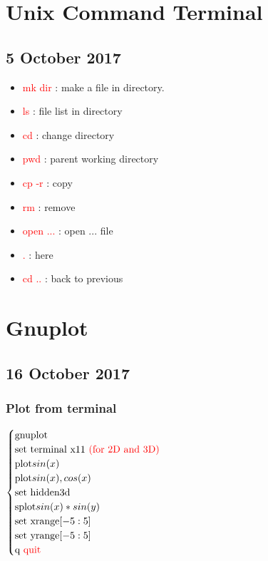 \documentclass[a4paper,10pt]{article}
\begin{document}
\newpage
\section{Unix Command Terminal}

\subsection{5 October 2017}
\begin{itemize}
	\item \textcolor{red}{mk dir} : make a file in directory.
	\item \textcolor{red}{ls} : file list in directory
	\item \textcolor{red}{cd} : change directory
	\item \textcolor{red}{pwd} : parent working directory
	\item \textcolor{red}{cp -r} : copy
	\item \textcolor{red}{rm} : remove
	\item \textcolor{red}{open ...} : open ... file
	\item \textcolor{red}{.} : here
	\item \textcolor{red}{cd ..} : back to previous
\end{itemize}

\section{Gnuplot}
\subsection{16 October 2017}
\subsubsection{Plot from terminal}
$ \begin{cases}
	\text{gnuplot} \\
	\text{set terminal x11 \textcolor{red}{(for 2D and 3D)}} \\
	\text{plot} sin(x) \\
	\text{plot} sin(x), cos(x) \\
	\text{set hidden3d} \\
	\text{splot} sin(x)*sin(y) \\
	\text{set xrange}[-5:5] \\
	\text{set yrange}[-5:5] \\
	\text{q \textcolor{red}{quit}}	
\end{cases} $
\end{document}
